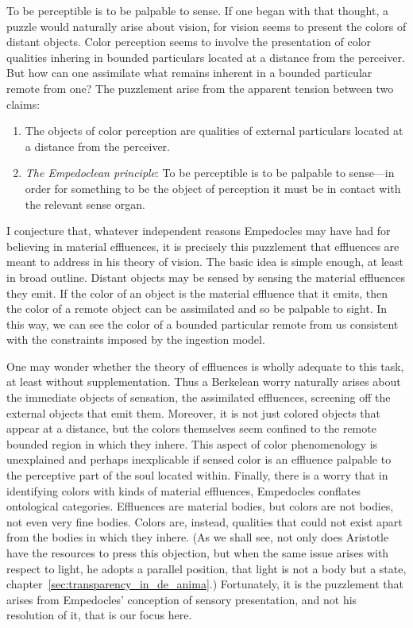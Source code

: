 To be perceptible is to be palpable to sense. If one began with that thought, a puzzle would naturally arise about vision, for vision seems to present the colors of distant objects. Color perception seems to involve the presentation of color qualities inhering in bounded particulars located at a distance from the perceiver. But how can one assimilate what remains inherent in a bounded particular remote from one? The puzzlement arise from the apparent tension between two claims:
\begin{enumerate}[(1)]
    \item The objects of color perception are qualities of external particulars located at a distance from the perceiver.
    \item \emph{The Empedoclean principle}: To be perceptible is to be palpable to sense---in order for something to be the object of perception it must be in contact with the relevant sense organ.
\end{enumerate}
I conjecture that, whatever independent reasons Empedocles may have had for believing in material effluences, it is precisely this puzzlement that effluences are meant to address in his theory of vision. The basic idea is simple enough, at least in broad outline. Distant objects may be sensed by sensing the material effluences they emit. If the color of an object is the material effluence that it emits, then the color of a remote object can be assimilated and so be palpable to sight. In this way, we can see the color of a bounded particular remote from us  consistent with the constraints imposed by the ingestion model. 

One may wonder whether the theory of effluences is wholly adequate to this task, at least without supplementation. Thus a Berkelean worry naturally arises about the immediate objects of sensation, the assimilated effluences, screening off the external objects that emit them. Moreover, it is not just colored objects that appear at a distance, but the colors themselves seem confined to the remote bounded region in which they inhere. This aspect of color phenomenology is unexplained and perhaps inexplicable if sensed color is an effluence palpable to the perceptive part of the soul located within. Finally, there is a worry that in identifying colors with kinds of material effluences, Empedocles conflates ontological categories. Effluences are material bodies, but colors are not bodies, not even very fine bodies. Colors are, instead, qualities that could not exist apart from the bodies in which they inhere. (As we shall see, not only does Aristotle have the resources to press this objection, but when the same issue arises with respect to light, he adopts a parallel position, that light is not a body but a state, chapter~\ref{sec:transparency_in_de_anima}.) Fortunately, it is the puzzlement that arises from Empedocles' conception of sensory presentation, and not his resolution of it, that is our focus here. 

